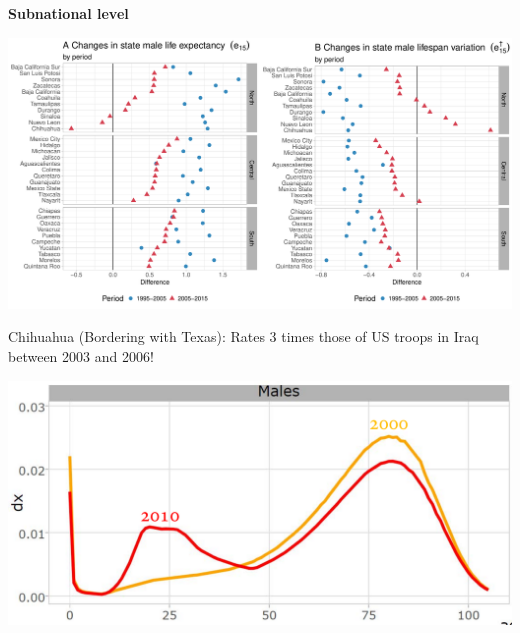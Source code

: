 \documentclass[xcolor={dvipsnames}]{beamer}
\begin{document}
\begin{frame}
\begin{center}
\Large{\textbf{Subnational level}}
\end{center}

\hspace*{-1cm}   
\includegraphics[scale=.38]{Figures/Figure_3}

\end{frame}



\begin{frame}

\Large{
Chihuahua (Bordering with Texas): Rates 3 times those of US troops in Iraq between 2003 and 2006!
				\begin{center}
		\includegraphics[scale=.45]{Figures/Distr_chihuahua}
				\end{center}				

}
\end{frame}
\end{document}
